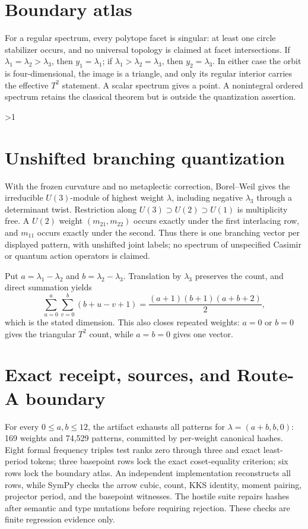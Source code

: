 \documentclass[10pt]{article}
\begin{document}
\section{Boundary atlas}
For a regular spectrum, every polytope facet is singular: at least one circle stabilizer occurs, and no universal topology is claimed at facet intersections.  If $\lambda_1=\lambda_2>\lambda_3$, then $y_1=\lambda_1$; if $\lambda_1>\lambda_2=\lambda_3$, then $y_2=\lambda_3$.  In either case the orbit is four-dimensional, the image is a triangle, and only its regular interior carries the effective $T^2$ statement.  A scalar spectrum gives a point.  A nonintegral ordered spectrum retains the classical theorem but is outside the quantization assertion.
\fi

\ifnum\CRevisionRound>1
\section{Unshifted branching quantization}
With the frozen curvature and no metaplectic correction, Borel--Weil gives the irreducible $U(3)$-module of highest weight $\lambda$, including negative $\lambda_3$ through a determinant twist.  Restriction along
$U(3)\supset U(2)\supset U(1)$ is multiplicity free.  A $U(2)$ weight $(m_{21},m_{22})$ occurs exactly under the first interlacing row, and $m_{11}$ occurs exactly under the second.  Thus there is one branching vector per displayed pattern, with unshifted joint labels; no spectrum of unspecified Casimir or quantum action operators is claimed.

Put $a=\lambda_1-\lambda_2$ and $b=\lambda_2-\lambda_3$.  Translation by $\lambda_3$ preserves the count, and direct summation yields
\[
 \sum_{u=0}^{a}\sum_{v=0}^{b}(b+u-v+1)
 =\frac{(a+1)(b+1)(a+b+2)}2,
\]
which is the stated dimension.  This also closes repeated weights: $a=0$ or $b=0$ gives the triangular $T^2$ count, while $a=b=0$ gives one vector.

\section{Exact receipt, sources, and Route-A boundary}
For every $0\leq a,b\leq12$, the artifact exhausts all patterns for $\lambda=(a+b,b,0)$: 169 weights and 74,529 patterns, committed by per-weight canonical hashes.  Eight formal frequency triples test ranks zero through three and exact least-period tokens; three basepoint rows lock the exact coset-equality criterion; six rows lock the boundary atlas.  An independent implementation reconstructs all rows, while SymPy checks the arrow cubic, count, KKS identity, moment pairing, projector period, and the basepoint witnesses.  The hostile suite repairs hashes after semantic and type mutations before requiring rejection.  These checks are finite regression evidence only.
\end{document}

